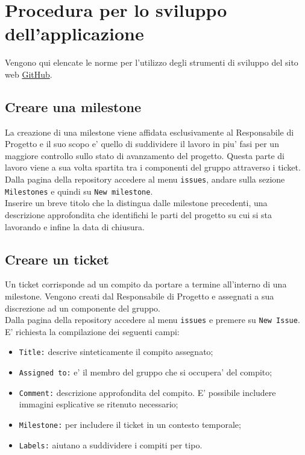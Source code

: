 \section{Procedura per lo sviluppo dell'applicazione}
Vengono qui elencate le norme per l'utilizzo degli strumenti di sviluppo del sito web \href{http://www.github.com/}{GitHub}.
\subsection{Creare una milestone}
La creazione di una milestone viene affidata esclusivamente al Responsabile di Progetto e il suo scopo e' quello di suddividere il lavoro in piu' fasi per un maggiore controllo sullo stato di avanzamento del progetto. Questa parte di lavoro viene a sua volta spartita tra i componenti del gruppo attraverso i ticket. \\
    Dalla pagina della repository accedere al menu \texttt{issues}, andare sulla sezione \texttt{Milestones} e quindi su \texttt{New milestone}.\\
    Inserire un breve titolo che la distingua dalle milestone precedenti, una descrizione approfondita che identifichi le parti del progetto su cui si sta lavorando e infine la data di chiusura.

\subsection{Creare un ticket}
Un ticket corrisponde ad un compito da portare a termine all'interno di una milestone. Vengono creati dal Responsabile di Progetto e assegnati a sua discrezione ad un componente del gruppo. \\
Dalla pagina della repository accedere al menu \texttt{issues} e premere su \texttt{New Issue}.\\
E' richiesta la compilazione dei seguenti campi:
\begin{itemize}
    \item \texttt{Title:} descrive sinteticamente il compito assegnato;
    \item \texttt{Assigned to:} e' il membro del gruppo che si occupera' del compito;
    \item \texttt{Comment:} descrizione approfondita del compito. E' possibile includere immagini esplicative se ritenuto necessario;
    \item \texttt{Milestone:} per includere il ticket in un contesto temporale;
    \item \texttt{Labels:} aiutano a suddividere i compiti per tipo.
\end{itemize}

